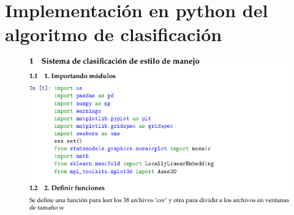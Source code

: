 

\chapter{Implementación en python del algoritmo de clasificación}
\label{anexo:codigo}

\begin{figure}[htbp!]
\centering
\includegraphics[width=\textwidth]{Appendix2/primera_pag.pdf}
\end{figure}



